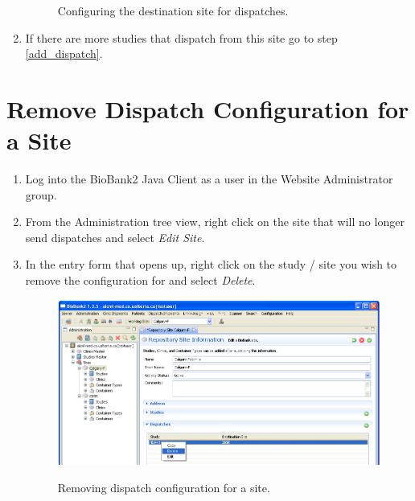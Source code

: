 \begin{enumerate}
\begin{figure}[H]
      \caption{Configuring the destination site for dispatches.}
      \label{fig:dispatch_add_config_dest_site}
    \end{figure}
  \item If there are more studies that dispatch from this site go to step \ref{add_dispatch}.
\end{enumerate}
\section{Remove Dispatch Configuration for a Site}
\label{sec:config_send_remove}
\begin{enumerate}
  \item Log into the BioBank2 Java Client as a user in the Website
    Administrator group.
  \item From the Administration tree view, right click on the site that will no longer send
    dispatches and select \emph{Edit Site}.
  \item In the entry form that opens up, right click on the study / site you
    wish to remove the configuration for and select \emph{Delete}.
    \begin{figure}[H]
      \centering
      \scalebox{0.5}
      { \includegraphics*{screenshots/dispatch/del_config} }
      \caption{Removing dispatch configuration for a site.}
      \label{fig:dispatch_del_config}
    \end{figure}
\end{enumerate}
